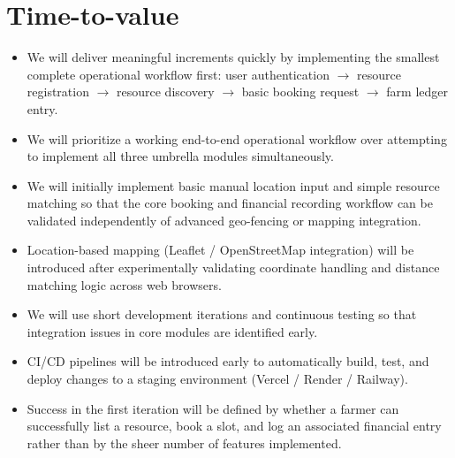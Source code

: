 \documentclass[11pt,a4paper]{article}
\begin{document}
\section{Time-to-value}
\begin{itemize}[leftmargin=*]
    \item We will deliver meaningful increments quickly by implementing the smallest complete operational workflow first: user authentication $\rightarrow$ resource registration $\rightarrow$ resource discovery $\rightarrow$ basic booking request $\rightarrow$ farm ledger entry.
    \item We will prioritize a working end-to-end operational workflow over attempting to implement all three umbrella modules simultaneously.
    \item We will initially implement basic manual location input and simple resource matching so that the core booking and financial recording workflow can be validated independently of advanced geo-fencing or mapping integration.
    \item Location-based mapping (Leaflet / OpenStreetMap integration) will be introduced after experimentally validating coordinate handling and distance matching logic across web browsers.
    \item We will use short development iterations and continuous testing so that integration issues in core modules are identified early.
    \item CI/CD pipelines will be introduced early to automatically build, test, and deploy changes to a staging environment (Vercel / Render / Railway).
    \item Success in the first iteration will be defined by whether a farmer can successfully list a resource, book a slot, and log an associated financial entry rather than by the sheer number of features implemented.
\end{itemize}
\end{document}

